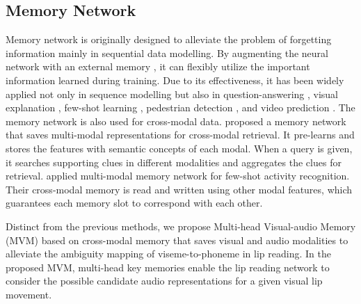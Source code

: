 \documentclass[letterpaper]{article} \usepackage{aaai22}  \usepackage{times}  \usepackage{helvet}  \usepackage{courier}  \usepackage[hyphens]{url}  \usepackage{graphicx} \urlstyle{rm} \def\UrlFont{\rm}  \usepackage{natbib}  \usepackage{caption} \DeclareCaptionStyle{ruled}{labelfont=normalfont,labelsep=colon,strut=off} \frenchspacing  \setlength{\pdfpagewidth}{8.5in}  \setlength{\pdfpageheight}{11in}  \usepackage{algorithm}
\begin{document}
\subsection{Memory Network}
Memory network is originally designed to alleviate the problem of forgetting information mainly in sequential data modelling. By augmenting the neural network with an external memory \cite{weston2014memory,sukhbaatar2015endmem}, it can flexibly utilize the important information learned during training. Due to its effectiveness, it has been widely applied not only in sequence modelling but also in question-answering \cite{miller2016keyvalue}, visual explanation \cite{kim2021mcam}, few-shot learning \cite{zhu2018fewshotmem}, pedestrian detection \cite{kim2021pedemem}, and video prediction \cite{lee2021videopredictionmem}. The memory network is also used for cross-modal data. \cite{song2018memoryforcrossmodalretrieval} proposed a memory network that saves multi-modal representations for cross-modal retrieval. It pre-learns and stores the features with semantic concepts of each modal. When a query is given, it searches supporting clues in different modalities and aggregates the clues for retrieval. \cite{zhang2020fewshotcrossmodalmem} applied multi-modal memory network for few-shot activity recognition. Their cross-modal memory is read and written using other modal features, which guarantees each memory slot to correspond with each other.

Distinct from the previous methods, we propose Multi-head Visual-audio Memory (MVM) based on cross-modal memory that saves visual and audio modalities to alleviate the ambiguity mapping of viseme-to-phoneme in lip reading. In the proposed MVM, multi-head key memories enable the lip reading network to consider the possible candidate audio representations for a given visual lip movement.
\end{document}
